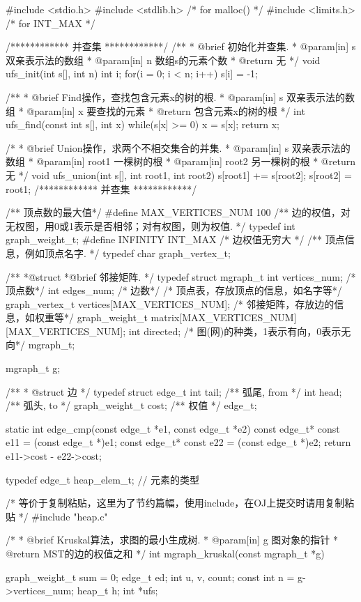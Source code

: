 \begin{Codex}[label=mgraph_kruskal.c]
#include <stdio.h>
#include <stdlib.h>  /* for malloc() */
#include <limits.h>  /* for INT_MAX */

/************ 并查集 ************/
/**
  * @brief 初始化并查集.
  * @param[in] s 双亲表示法的数组
  * @param[in] n 数组s的元素个数
  * @return 无
  */
void ufs_init(int s[], int n) {
    int i;
    for(i = 0; i < n; i++) s[i] = -1;
}

/**
  * @brief Find操作，查找包含元素x的树的根.
  * @param[in] s 双亲表示法的数组
  * @param[in] x 要查找的元素
  * @return 包含元素x的树的根
  */
int ufs_find(const int s[], int x) {
    while(s[x] >= 0) {
        x = s[x];
    }
    return x;
}

 /*
  * @brief Union操作，求两个不相交集合的并集.
  * @param[in] s 双亲表示法的数组
  * @param[in] root1 一棵树的根
  * @param[in] root2 另一棵树的根
  * @return 无
  */
void ufs_union(int s[], int root1, int root2) {
    s[root1] += s[root2];
    s[root2] = root1;
}
/************ 并查集 ************/


/** 顶点数的最大值*/
#define MAX_VERTICES_NUM 100
/** 边的权值，对无权图，用0或1表示是否相邻；对有权图，则为权值. */
typedef int graph_weight_t;
#define INFINITY INT_MAX  /* 边权值无穷大 */
/** 顶点信息，例如顶点名字. */
typedef char graph_vertex_t;

/**
 *@struct
 *@brief 邻接矩阵.
 */
typedef struct mgraph_t {
    int vertices_num; /* 顶点数*/
    int edges_num; /* 边数*/
    /* 顶点表，存放顶点的信息，如名字等*/
    graph_vertex_t vertices[MAX_VERTICES_NUM];
    /* 邻接矩阵，存放边的信息，如权重等*/
    graph_weight_t matrix[MAX_VERTICES_NUM][MAX_VERTICES_NUM];
    int directed; /* 图(网)的种类，1表示有向，0表示无向*/
} mgraph_t;

mgraph_t g;


/**
 * @struct 边
 */
typedef struct edge_t{
    int tail;  /** 弧尾, from */
    int head;  /** 弧头, to */
    graph_weight_t cost;  /** 权值 */
}edge_t;

static int edge_cmp(const edge_t *e1, const edge_t *e2) {
    const edge_t* const e11 = (const edge_t *)e1;
    const edge_t* const e22 = (const edge_t *)e2;
    return e11->cost - e22->cost;
}

typedef edge_t heap_elem_t; // 元素的类型

/* 等价于复制粘贴，这里为了节约篇幅，使用include，在OJ上提交时请用复制粘贴 */
#include "heap.c"


/*
  * @brief Kruskal算法，求图的最小生成树.
  * @param[in] g 图对象的指针
  * @return MST的边的权值之和
  */
int mgraph_kruskal(const mgraph_t *g) {
    graph_weight_t sum = 0;
    edge_t ed;
    int u, v, count;
    const int n = g->vertices_num;
    heap_t h;
    int *ufs;

}
\end{Codex}
